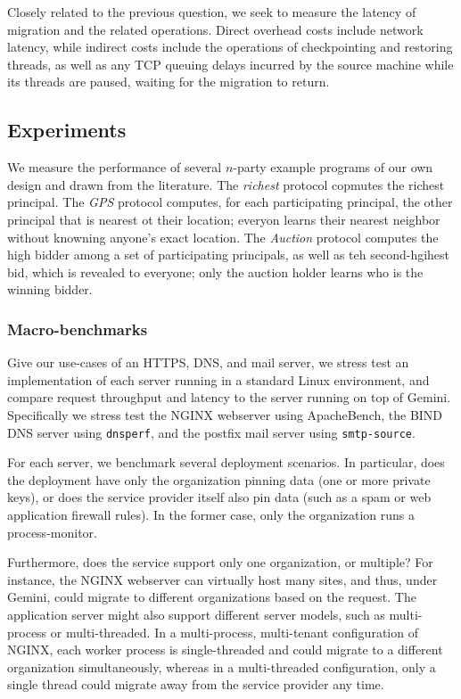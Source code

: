 Closely related to the previous question, we seek to measure the latency of
migration and the related operations.
%
Direct overhead costs include network latency, while indirect costs include the
operations of checkpointing and restoring threads, as well as any TCP queuing
delays incurred by the source machine while its threads are paused, waiting for
the migration to return.


\subsection{Experiments}

We measure the performance of several $n$-party example programs of our own
design and drawn from the literature.
%
The \emph{richest} protocol copmutes the richest principal.
%
The \emph{GPS} protocol computes, for each participating principal, the other
principal that is nearest ot their location; everyon learns their nearest
neighbor without knowning anyone's exact location.
%
The \emph{Auction} protocol computes the high bidder among a set of
participating principals, as well as teh second-hgihest bid, which is revealed
to everyone; only the auction holder learns who is the winning bidder.
%



\subsubsection{Macro-benchmarks}

%
Give our use-cases of an HTTPS, DNS, and mail server, we stress test an
implementation of each server running in a standard Linux environment, and
compare request throughput and latency to the server running on top of Gemini.
%
Specifically we stress test the NGINX webserver using ApacheBench, the BIND DNS
server using \texttt{dnsperf}, and the postfix mail server using
\texttt{smtp-source}.


For each server, we benchmark several deployment scenarios.
%
In particular, does the deployment have only the organization pinning data (one
or more private keys), or does the service provider itself also pin data (such
as a spam or web application firewall rules).
%
In the former case, only the organization runs a process-monitor.


Furthermore, does the service support only one organization, or multiple?
%
For instance, the NGINX webserver can virtually host many sites, and thus,
under Gemini, could migrate to different organizations based on the request.
%
The application server might also support different server models, such as
multi-process or multi-threaded.
%
In a multi-process, multi-tenant configuration of NGINX, each worker process
is single-threaded and could migrate to a different organization
simultaneously, whereas in a multi-threaded configuration, only a single thread
could migrate away from the service provider any time.
